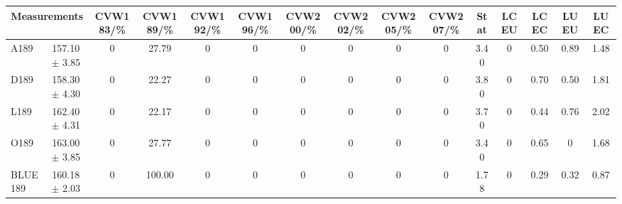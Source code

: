 \begin{table}[H]
\scriptsize
\begin{center}
\renewcommand{\arraystretch}{1.1}
\begin{tabular}{|lc|c|c|c|c|c|c|c|c|ccccc|}
\hline
\multicolumn{2}{|c|}{Measurements} & CVW{\tiny 183}/\%  & CVW{\tiny 189}/\%  & CVW{\tiny 192}/\%  & CVW{\tiny 196}/\%  & CVW{\tiny 200}/\%  & CVW{\tiny 202}/\%  & CVW{\tiny 205}/\%  & CVW{\tiny 207}/\%  & {\tiny Stat} & {\tiny LCEU} & {\tiny LCEC} & {\tiny LUEU} & {\tiny LUEC}\\
\hline
A189 &     157.10 $\pm$       3.85 &  0 &      27.79 &  0 &  0 &  0 &  0 &  0 &  0 &       3.40 &  0 &       0.50 &       0.89 &       1.48\\
D189 &     158.30 $\pm$       4.30 &  0 &      22.27 &  0 &  0 &  0 &  0 &  0 &  0 &       3.80 &  0 &       0.70 &       0.50 &       1.81\\
L189 &     162.40 $\pm$       4.31 &  0 &      22.17 &  0 &  0 &  0 &  0 &  0 &  0 &       3.70 &  0 &       0.44 &       0.76 &       2.02\\
O189 &     163.00 $\pm$       3.85 &  0 &      27.77 &  0 &  0 &  0 &  0 &  0 &  0 &       3.40 &  0 &       0.65 &  0 &       1.68\\
\hline
BLUE {\tiny 189} &     160.18 $\pm$       2.03 &  0 &     100.00 &  0 &  0 &  0 &  0 &  0 &  0 &       1.78 &  0 &       0.29 &       0.32 &       0.87\\
\hline
\end{tabular}
\renewcommand{\arraystretch}{1}
\end{center}
\end{table}
\vspace*{-0.5cm}
